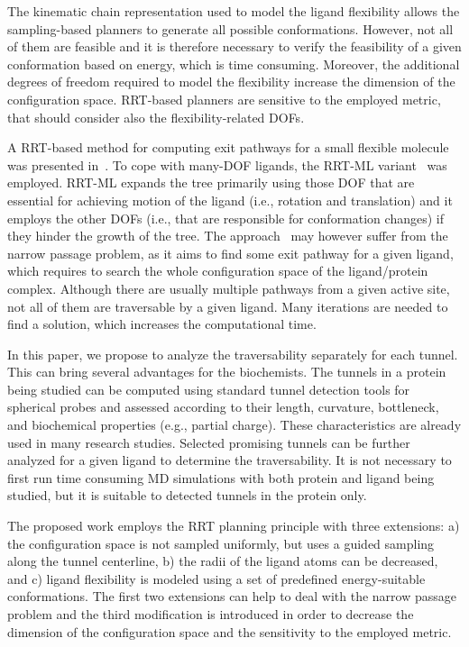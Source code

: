 \documentclass{svmult}
\begin{document}
The kinematic chain representation used to model the ligand flexibility allows the sampling-based planners to generate all possible conformations.
However, not all of them are feasible and it is therefore necessary to verify the feasibility of a given conformation based on energy, which is time consuming.
Moreover, the additional degrees of freedom required to model the flexibility increase the dimension of the configuration space.
RRT-based planners are sensitive to the employed metric, that should consider also the flexibility-related DOFs.

A RRT-based method for computing exit pathways for a small flexible molecule was presented in~\cite{cortes2010simulating}.
To cope with many-DOF ligands, the RRT-ML variant~\cite{cortes2007mlrrt} was employed.
RRT-ML expands the tree primarily using those DOF that are essential for achieving motion of the ligand (i.e., rotation
and translation) and it employs the other DOFs (i.e., that are responsible for conformation changes) if they hinder the growth of the tree.
The approach~\cite{cortes2010simulating} may however suffer from the narrow passage problem, as it aims to find some exit pathway for a given ligand, which requires to search the whole configuration space of the ligand/protein complex.
Although there are usually multiple pathways from a given active site, not all of them are traversable by a given ligand.
Many iterations are needed to find a solution, which increases the computational time.

In this paper, we propose to analyze the traversability separately for each tunnel.
This can bring several advantages for the biochemists.
The tunnels in a protein being studied can be computed using standard tunnel detection tools for spherical probes and assessed
according to their length, curvature, bottleneck, and biochemical properties (e.g., partial charge).
These characteristics are already used in many research studies.
Selected promising tunnels can be further analyzed for a given ligand to determine the traversability.
It is not necessary to first run time consuming MD simulations with both protein and ligand being studied, but it is suitable
to detected tunnels in the protein only.

The proposed work employs the RRT planning principle with three extensions: 
a) the configuration space is not sampled uniformly, but uses a guided sampling along the tunnel centerline,
b) the radii of the ligand atoms can be decreased, and 
c) ligand flexibility is modeled using a set of predefined energy-suitable conformations.
The first two extensions can help to deal with the narrow passage problem and the third modification
is introduced in order to decrease the dimension of the configuration space and the sensitivity to the employed
metric.
\end{document}
